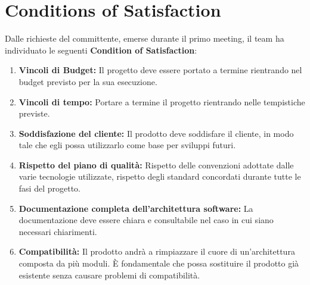 \documentclass[12pt, a4paper]{article}
\begin{document}
\section*{Conditions of Satisfaction}

Dalle richieste del committente, emerse durante il primo meeting, il team ha individuato le seguenti \textbf{Condition of 
Satisfaction}:

\begin{enumerate}
    \item \textbf{Vincoli di Budget:} Il progetto deve essere portato a termine rientrando nel budget previsto per la 
    sua esecuzione.
    \item \textbf{Vincoli di tempo:} Portare a termine il progetto rientrando nelle tempistiche previste.
    \item \textbf{Soddisfazione del cliente:} Il prodotto deve soddisfare il cliente, in modo tale che egli possa 
    utilizzarlo come base per sviluppi futuri.
    \item \textbf{Rispetto del piano di qualità:} Rispetto delle convenzioni adottate dalle varie tecnologie utilizzate,
    rispetto degli standard concordati durante tutte le fasi del progetto.
    \item \textbf{Documentazione completa dell'architettura software:} La documentazione deve essere chiara e consultabile
    nel caso in cui siano necessari chiarimenti.
    \item \textbf{Compatibilità:} Il prodotto andrà a rimpiazzare il cuore di un'architettura composta da più moduli.
    È fondamentale che possa sostituire il prodotto già esistente senza causare problemi di compatibilità.
\end{enumerate}
\end{document}

